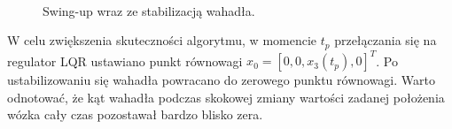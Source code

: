 \begin{figure}[H]
	~~
	
	\caption{Swing-up wraz ze stabilizacją wahadła.}
\label{fig:Swing1}
\end{figure}
W celu zwiększenia skuteczności algorytmu, w momencie $t_p$ przełączania się na regulator LQR ustawiano punkt równowagi $x_0=[0,0,x_3(t_p),0]^T$. Po ustabilizowaniu się wahadła powracano do zerowego punktu równowagi. Warto odnotować, że kąt wahadła podczas skokowej zmiany wartości zadanej położenia wózka cały czas pozostawał bardzo blisko zera.
